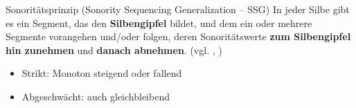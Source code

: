 \begin{frame}


\begin{block}{Sonoritätsprinzip (Sonority Sequencing Generalization -- SSG)}
In jeder Silbe gibt es ein Segment, das den \textbf{Silbengipfel} bildet, und dem ein oder mehrere Segmente vorangehen und/oder folgen, deren Sonoritätswerte \textbf{zum Silbengipfel hin zunehmen} und \textbf{danach abnehmen}. (vgl. \citealt[225]{Hall00a}, \citealt[94]{Ramers08a})
\end{block}

\begin{itemize}
	\item Strikt: Monoton steigend oder fallend
	\item Abgeschwächt: auch gleichbleibend \citep[vgl.][]{Hall00a}

\end{itemize}


\begin{figure}
	\centering
\caption{\citet[93]{Ramers08a} \citep[nach][]{Lenerz85a}}
\end{figure}


\end{frame}


